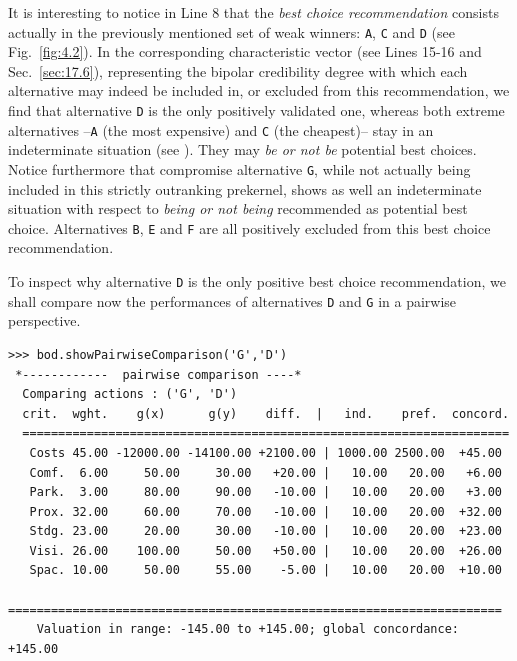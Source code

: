 It is interesting to notice in Line 8 that the \Rubis \emph{best choice recommendation} consists actually in the previously mentioned set of weak \Condorcet winners: \texttt{A}, \texttt{C} and \texttt{D} (see Fig.~\vref{fig:4.2}). In the corresponding characteristic vector (see Lines 15-16 and Sec.~\vref{sec:17.6}), representing the bipolar credibility degree with which each alternative may indeed be included in, or excluded from this recommendation, we find that alternative \texttt{D} is the only positively validated one, whereas both extreme alternatives --\texttt{A} (the most expensive) and \texttt{C} (the cheapest)-- stay in an indeterminate situation (see \citealp{BIS-2006a,BIS-2006b}). They may \emph{be or not be} potential best choices. Notice furthermore that compromise alternative \texttt{G}, while not actually being included in this strictly outranking prekernel, shows as well an indeterminate situation with respect to \emph{being or not being} recommended as potential best choice. Alternatives \texttt{B}, \texttt{E} and \texttt{F} are all positively excluded from this best choice recommendation.

To inspect why alternative \texttt{D} is the only positive best choice recommendation, we shall compare now the performances of alternatives \texttt{D} and \texttt{G} in a pairwise perspective.
\begin{lstlisting}[caption={Inspecting pairwise comparison between alternatives \texttt{G} and \texttt{D}},label=list:4.5,basicstyle=\ttfamily\scriptsize]
>>> bod.showPairwiseComparison('G','D')
 *------------  pairwise comparison ----*
  Comparing actions : ('G', 'D')
  crit.  wght.    g(x)      g(y)    diff.  |   ind.    pref.  concord. 
  ====================================================================
   Costs 45.00 -12000.00 -14100.00 +2100.00 | 1000.00 2500.00  +45.00  
   Comf.  6.00     50.00     30.00   +20.00 |   10.00   20.00   +6.00 
   Park.  3.00     80.00     90.00   -10.00 |   10.00   20.00   +3.00 
   Prox. 32.00     60.00     70.00   -10.00 |   10.00   20.00  +32.00 
   Stdg. 23.00     20.00     30.00   -10.00 |   10.00   20.00  +23.00 
   Visi. 26.00    100.00     50.00   +50.00 |   10.00   20.00  +26.00 
   Spac. 10.00     50.00     55.00    -5.00 |   10.00   20.00  +10.00
   =====================================================================
    Valuation in range: -145.00 to +145.00; global concordance: +145.00
\end{lstlisting}

